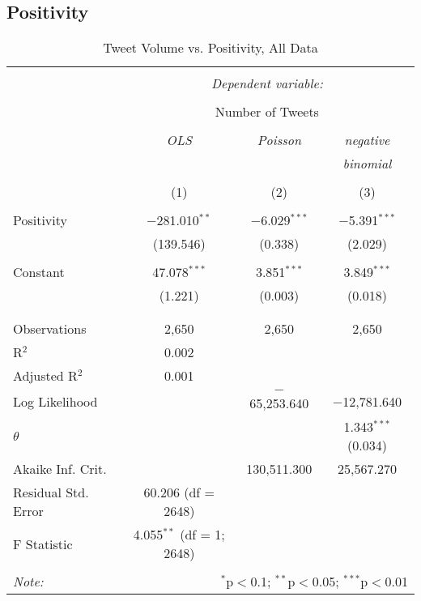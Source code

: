 \subsection{Positivity}
\begin{table}[H] \centering 
  \caption{Tweet Volume vs. Positivity, All Data} 
  \label{} 
    \begin{tabular}{@{\extracolsep{5pt}}lccc} 
    \\[-1.8ex]\hline 
    \hline \\[-1.8ex] 
     & \multicolumn{3}{c}{\textit{Dependent variable:}} \\ 
    \cline{2-4} 
    \\[-1.8ex] & \multicolumn{3}{c}{Number of Tweets} \\ 
    \\[-1.8ex] & \textit{OLS} & \textit{Poisson} & \textit{negative} \\ 
     & \textit{} & \textit{} & \textit{binomial} \\ 
    \\[-1.8ex] & (1) & (2) & (3)\\ 
    \hline \\[-1.8ex] 
     Positivity & $-$281.010$^{**}$ & $-$6.029$^{***}$ & $-$5.391$^{***}$ \\ 
      & (139.546) & (0.338) & (2.029) \\ 
      & & & \\ 
     Constant & 47.078$^{***}$ & 3.851$^{***}$ & 3.849$^{***}$ \\ 
      & (1.221) & (0.003) & (0.018) \\ 
      & & & \\ 
    \hline \\[-1.8ex] 
    Observations & 2,650 & 2,650 & 2,650 \\ 
    R$^{2}$ & 0.002 &  &  \\ 
    Adjusted R$^{2}$ & 0.001 &  &  \\ 
    Log Likelihood &  & $-$65,253.640 & $-$12,781.640 \\ 
    $\theta$ &  &  & 1.343$^{***}$  (0.034) \\ 
    Akaike Inf. Crit. &  & 130,511.300 & 25,567.270 \\ 
    Residual Std. Error & 60.206 (df = 2648) &  &  \\ 
    F Statistic & 4.055$^{**}$ (df = 1; 2648) &  &  \\ 
    \hline 
    \hline \\[-1.8ex] 
    \textit{Note:}  & \multicolumn{3}{r}{$^{*}$p$<$0.1; $^{**}$p$<$0.05; $^{***}$p$<$0.01} \\ 
    \end{tabular} 
\end{table} 



